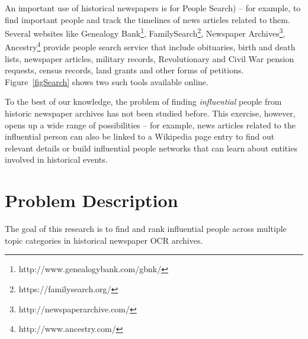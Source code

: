 An important use of historical newspapers is for People Search\cite{BilenkoMCRF03,Friedman_92}) -- for example, to find important people and track the timelines of news articles related to them. Several websites like Genealogy Bank\footnote{http://www.genealogybank.com/gbnk/}, FamilySearch\footnote{https://familysearch.org/}, Newspaper Archives\footnote{http://newspaperarchive.com/}, Ancestry\footnote{http://www.ancestry.com/} provide people search service that include obituaries, birth and death lists, newspaper articles, military records, Revolutionary and Civil War pension requests, census records, land grants and other forms of petitions. Figure~\ref{figSearch} shows two such tools available online.



  
To the best of our knowledge, the problem of finding \emph{influential} people from historic newspaper archives has not been studied before. This exercise, however, opens up a wide range of possibilities -- for example, news articles related to the influential person can also be linked to a Wikipedia page entry to find out relevant details or build influential people networks that can learn about entities involved in historical events. 

\section{Problem Description}
\label{problem}


The goal of this research is to find and rank influential people across multiple topic categories in historical newspaper OCR archives.



